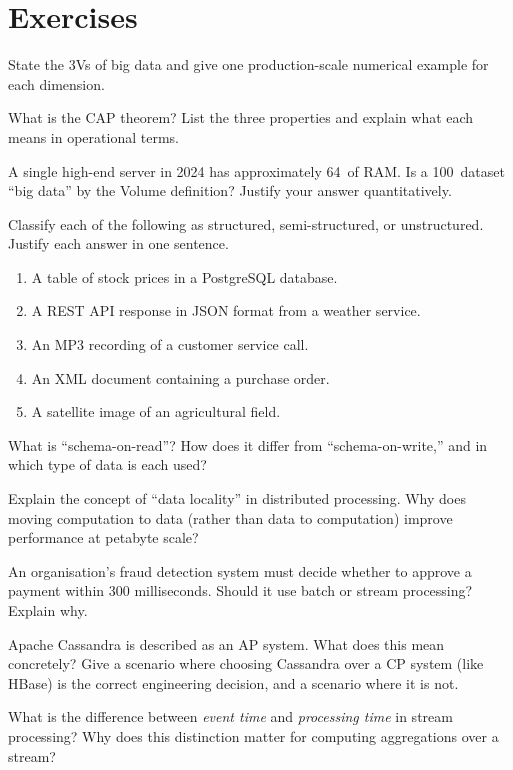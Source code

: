 \section*{Exercises}
\label{sec:ch1-exercises}


\sq State the 3Vs of big data and give one production-scale numerical
example for each dimension.

\sq What is the CAP theorem? List the three properties and explain what
each means in operational terms.

\sq A single high-end server in 2024 has approximately 64\TB\ of RAM.
Is a 100\PB\ dataset ``big data'' by the Volume definition? Justify your
answer quantitatively.

\sq Classify each of the following as structured, semi-structured, or
unstructured. Justify each answer in one sentence.
\begin{enumerate}[label=(\alph*)]
  \item A table of stock prices in a PostgreSQL database.
  \item A REST API response in JSON format from a weather service.
  \item An MP3 recording of a customer service call.
  \item An XML document containing a purchase order.
  \item A satellite image of an agricultural field.
\end{enumerate}

\sq What is ``schema-on-read''? How does it differ from ``schema-on-write,''
and in which type of data is each used?

\sq Explain the concept of ``data locality'' in distributed processing.
Why does moving computation to data (rather than data to computation)
improve performance at petabyte scale?

\sq An organisation's fraud detection system must decide whether to
approve a payment within 300 milliseconds. Should it use batch or stream
processing? Explain why.

\sq Apache Cassandra is described as an AP system. What does this mean
concretely? Give a scenario where choosing Cassandra over a CP system
(like HBase) is the correct engineering decision, and a scenario where
it is not.

\sq What is the difference between \emph{event time} and
\emph{processing time} in stream processing? Why does this distinction
matter for computing aggregations over a stream?

